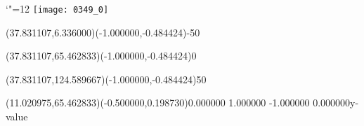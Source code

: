 \documentclass[12pt]{article}
\begin{document}
\makeatletter%
\let\ASYencoding\f@encoding%
\let\ASYfamily\f@family%
\let\ASYseries\f@series%
\let\ASYshape\f@shape%
\makeatother%
{\catcode`"=12%
\texttt{[image: 0349\_0]}%
}%
\kern -48.302018pt%
%
%
\fontsize{12.045000}{14.454000}\selectfont%
%
\ASYalign(37.831107,6.336000)(-1.000000,-0.484424){\vphantom{$10^4$}-50}%
%
%
\fontsize{12.045000}{14.454000}\selectfont%
\ASYalign(37.831107,65.462833)(-1.000000,-0.484424){\vphantom{$10^4$}0}%
%
%
\fontsize{12.045000}{14.454000}\selectfont%
\ASYalign(37.831107,124.589667)(-1.000000,-0.484424){\vphantom{$10^4$}50}%
%
%
\fontsize{12.045000}{14.454000}\selectfont%
\ASYalignT(11.020975,65.462833)(-0.500000,0.198730){0.000000 1.000000 -1.000000 0.000000}{y-value}%
\end{document}
